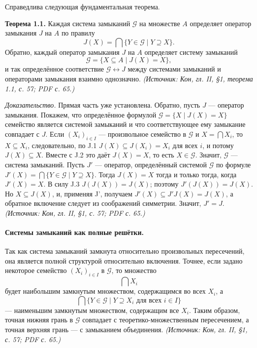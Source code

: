 \documentclass[a4paper,12pt]{article}
\begin{document}
Справедлива следующая фундаментальная теорема.

\textbf{Теорема 1.1.} Каждая система замыканий \(\mathcal{G}\) на множестве \(A\) определяет оператор замыкания \(J\) на \(A\) по правилу
\[
J(X)=\bigcap\{Y\in\mathcal{G}\mid Y\supseteq X\}.
\]
Обратно, каждый оператор замыкания \(J\) на \(A\) определяет систему замыканий
\[
\mathcal{G}=\{X\subseteq A\mid J(X)=X\},
\]
и так определённое соответствие \(\mathcal{G}\leftrightarrow J\) между системами замыканий и операторами замыкания взаимно однозначно.
\textit{(Источник: Кон, гл. II, §1, теорема 1.1, с. 57; PDF с. 65.)}

\emph{Доказательство.} Прямая часть уже установлена. Обратно, пусть \(J\) — оператор замыкания. Покажем, что определённое формулой \(\mathcal{G}=\{X\mid J(X)=X\}\) семейство является системой замыканий и что соответствующее ему замыкание совпадает с \(J\). Если \((X_i)_{i\in I}\) — произвольное семейство в \(\mathcal{G}\) и \(X=\bigcap X_i\), то \(X\subseteq X_i\), следовательно, по J.1 \(J(X)\subseteq J(X_i)=X_i\) для всех \(i\), и потому \(J(X)\subseteq X\). Вместе с J.2 это даёт \(J(X)=X\), то есть \(X\in\mathcal{G}\). Значит, \(\mathcal{G}\) — система замыканий. Пусть \(J'\) — оператор, определённый системой \(\mathcal{G}\) по формуле \(J'(X)=\bigcap\{Y\in\mathcal{G}\mid Y\supseteq X\}\). Тогда \(J(X)=X\) тогда и только тогда, когда \(J'(X)=X\). В силу J.3 \(J(J(X))=J(X)\); поэтому \(J'(J(X))=J(X)\). Но \(X\subseteq J(X)\), и, применяя J', получаем \(J'(X)\subseteq J'J(X)=J(X)\), а обратное включение следует из соображений симметрии. Значит, \(J'=J\).
\textit{(Источник: Кон, гл. II, §1, с. 57; PDF с. 65.)}

\paragraph{Системы замыканий как полные решётки.}
Так как система замыканий замкнута относительно произвольных пересечений, она является полной структурой относительно включения. Точнее, если задано некоторое семейство \((X_i)_{i\in I}\) в \(\mathcal{G}\), то множество
\[
\bigcap X_i
\]
будет наибольшим замкнутым множеством, содержащимся во всех \(X_i\), а
\[
\bigcap\{Y\in\mathcal{G}\mid Y\supseteq X_i\text{ для всех }i\in I\}
\]
— наименьшим замкнутым множеством, содержащим все \(X_i\). Таким образом, точная нижняя грань в \(\mathcal{G}\) совпадает с теоретико-множественным пересечением, а точная верхняя грань — с замыканием объединения.
\textit{(Источник: Кон, гл. II, §1, с. 57; PDF с. 65.)}
\end{document}
